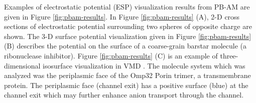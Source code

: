 \documentclass[journal=jpcbfk, manuscript=article]{achemso}
\begin{document}
Examples of electrostatic potential (ESP) visualization results from PB-AM are given in Figure \ref{fig:pbam-results}. In Figure \ref{fig:pbam-results} (A), 2-D cross sections of electrostatic potential surrounding two spheres of opposite charge are shown. The 3-D surface potential visualization given in Figure \ref{fig:pbam-results} (B) describes the potential on the surface of a coarse-grain barstar molecule (a ribonuclease inhibitor). Figure \ref{fig:pbam-results} (C) is an example of three-dimensional isosurface visualization in VMD \cite{humphrey1996}. The molecule system which was analyzed was the periplasmic face of the Omp32 Porin trimer, a transmembrane protein. The periplasmic face (channel exit) has a positive surface (blue) at the channel exit which may further enhance anion transport through the channel.  
\end{document}
